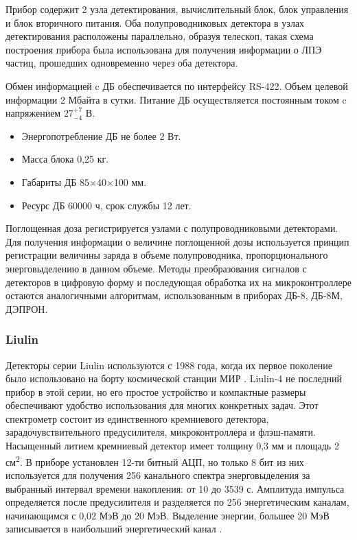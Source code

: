 Прибор содержит 2 узла детектирования, вычислительный блок, блок управления и блок вторичного питания. Оба полупроводниковых детектора в узлах детектирования расположены  параллельно,  образуя телескоп, такая схема построения прибора была использована для получения информации о ЛПЭ частиц, прошедших одновременно через оба детектора.         


Обмен информацией c ДБ обеспечивается по интерфейсу RS-422. Объем целевой информации 2 Мбайта в сутки. Питание ДБ осуществляется постоянным током c напряжением $ 27^{+7}_{-4} $ В. 

\begin{itemize}
\item Энергопотребление ДБ не более 2 Вт.
\item Масса блока 0,25 кг.
\item Габариты ДБ 85×40×100 мм. 
\item Ресурс ДБ  60000 ч, срок службы 12 лет.
\end{itemize}


Поглощенная доза регистрируется узлами с полупроводниковыми детекторами. Для получения информации о величине поглощенной дозы используется принцип регистрации величины заряда в объеме полупроводника, пропорционального энерговыделению в данном объеме. Методы преобразования сигналов с детекторов в цифровую форму и последующая обработка их на микроконтроллере остаются аналогичными алгоритмам, использованным в приборах ДБ-8, ДБ-8М, ДЭПРОН.  


\subsubsection{Liulin}

Детекторы серии Liulin используются с 1988 года, когда их первое поколение было использовано на борту космической станции МИР \cite{Caffrey2011}. Liulin-4 не последний прибор в этой серии, но его простое устройство и компактные размеры обеспечивают удобство использования для многих конкретных задач. Этот спектрометр состоит из единственного кремниевого детектора, зарадочувствительного предусилителя, микроконтроллера и флэш-памяти. Насыщенный литием кремниевый детектор имеет толщину 0,3 мм и площадь 2 см\textsuperscript{2}. В приборе установлен 12-ти битный АЦП, но только 8 бит из них используется для получения 256 канального спектра энерговыделения за выбранный интервал времени накопления: от 10 до 3539 с. Амплитуда импульса определяется после предусилителя и разделяется по 256 энергетическим каналам, начинающимся с 0,02 МэВ до 20 МэВ. Выделение энергии, большее 20 МэВ записывается в наибольший энергетический канал \cite{Dachev2002} .



